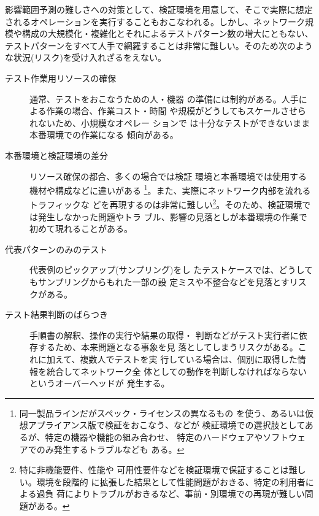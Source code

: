 影響範囲予測の難しさへの対策として、検証環境を用意して、そこで実際に想定
されるオペレーションを実行することもおこなわれる。しかし、ネットワーク規
模や構成の大規模化・複雑化とそれによるテストパターン数の増大にともない、
テストパターンをすべて人手で網羅することは非常に難しい。そのため次のよう
な状況(リスク)を受け入れざるをえない。
\begin{description}
 \item[テスト作業用リソースの確保] 通常、テストをおこなうための人・機器
            の準備には制約がある。人手による作業の場合、作業コスト・時間
            や規模がどうしてもスケールさせられないため、小規模なオペレー
            ションで は十分なテストができないまま本番環境での作業になる
            傾向がある。
 \item[本番環境と検証環境の差分] リソース確保の都合、多くの場合では検証
            環境と本番環境では使用する機材や構成などに違いがある
            \footnote{同一製品ラインだがスペック・ライセンスの異なるもの
            を使う、あるいは仮想アプライアンス版で検証をおこなう、などが
            検証環境での選択肢としてあるが、特定の機器や機能の組み合わせ、
            特定のハードウェアやソフトウェアでのみ発生するトラブルなども
            ある。}。また、実際にネットワーク内部を流れるトラフィックな
            どを再現するのは非常に難しい\footnote{特に非機能要件、性能や
            可用性要件などを検証環境で保証することは難しい。環境を段階的
            に拡張した結果として性能問題がおきる、特定の利用者による過負
            荷によりトラブルがおきるなど、事前・別環境での再現が難しい問
            題がある。}。そのため、検証環境では発生しなかった問題やトラ
            ブル、影響の見落としが本番環境の作業で初めて現れることがある。
 \item[代表パターンのみのテスト] 代表例のピックアップ(サンプリング)をし
            たテストケースでは、どうしてもサンプリングからもれた一部の設
            定ミスや不整合などを見落とすリスクがある。
 \item[テスト結果判断のばらつき] 手順書の解釈、操作の実行や結果の取得・
            判断などがテスト実行者に依存するため、本来問題となる事象を見
            落としてしまうリスクがある。これに加えて、複数人でテストを実
            行している場合は、個別に取得した情報を統合してネットワーク全
            体としての動作を判断しなければならないというオーバーヘッドが
            発生する。
\end{description}


